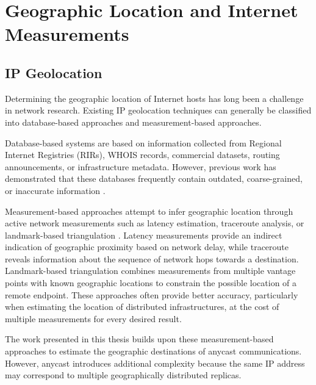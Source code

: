 \documentclass[
A4paper,                %
twoside,                %
openright,              %
chapterprefix=true,     %
12pt,                   %
headings=normal,        %
titlepage=on            %
]{book}
\providecommand{\DIFaddend}{} %
\DeclareRobustCommand{\DIFaddend}{\DIFOaddend \let\includegraphics\DIFOincludegraphics} %
\begin{document}
\DIFaddend %
\section{Geographic Location and Internet Measurements}
\label{sc:background_location_measurements}

\subsection{IP Geolocation}
\label{sc:background_location_measurements_ip_geolocation}

Determining the geographic location of Internet hosts has long been a challenge in network research. Existing IP geolocation techniques can generally be classified into database-based approaches and measurement-based approaches.

Database-based systems are based on information collected from Regional Internet Registries (RIRs), WHOIS records, commercial datasets, routing announcements, or infrastructure metadata. However, previous work has demonstrated that these databases frequently contain outdated, coarse-grained, or inaccurate information \cite{Ding2015AnSub-networks, Dan2021IPInterpolation, Cozar2022ReliabilityTransfers}.

Measurement-based approaches attempt to infer geographic location through active network measurements such as latency estimation, traceroute analysis, or landmark-based triangulation \cite{Cicalese2015AGeolocation,Cicalese2016Latency-BasedSets,Ciavarrini2018GeolocationBound}. Latency measurements provide an indirect indication of geographic proximity based on network delay, while traceroute reveals information about the sequence of network hops towards a destination. Landmark-based triangulation combines measurements from multiple vantage points with known geographic locations to constrain the possible location of a remote endpoint. These approaches often provide better accuracy, particularly when estimating the location of distributed infrastructures, at the cost of multiple measurements for every desired result.

The work presented in this thesis builds upon these measurement-based approaches to estimate the geographic destinations of anycast communications. However, anycast introduces additional complexity because the same IP address may correspond to multiple geographically distributed replicas.
\end{document}

